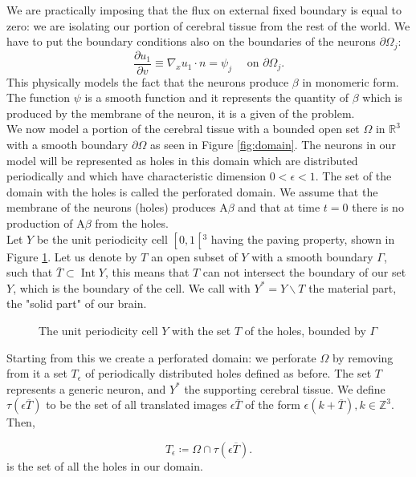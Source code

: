 We are practically imposing that the flux on external fixed boundary is equal to zero: we are isolating our portion of cerebral tissue from the rest of the world.
We have to put the boundary conditions also on the boundaries of the neurons $\partial\Omega_{j}$:
$$ 
\frac{\partial u_{1}}{\partial v} \equiv \nabla_{x} u_1 \cdot n= \psi_{j} \quad \text { on } \partial\Omega_{j}.
$$
This physically models the fact that the neurons produce \(\beta\) in monomeric form. The function $\psi$ is a smooth function and it represents the quantity of \(\beta\) which is produced by the membrane of the neuron, it is a given of the problem.\\
We now model a portion of the cerebral tissue with a bounded open set $\Omega$ in $\mathbb{R}^{3}$ with a smooth boundary $\partial \Omega$ as seen in Figure \ref{fig:domain}. The neurons in our model will be represented as holes in this domain which are distributed periodically and which have characteristic dimension $0<\epsilon<1$. The set of the domain with the holes is called the perforated domain.
We assume that the membrane of the neurons (holes) produces $\mathrm{A} \beta$ and that at time $t=0$ there is no production of  $\mathrm{A} \beta$ from the holes. \\
Let $Y$ be the unit periodicity cell $\left[0,1\left[{ }^{3}\right.\right.$ having the paving property, shown in Figure \ref{fig:unit_cell}. 
Let us denote by $T$ an open subset of $Y$ with a smooth boundary $\Gamma$, such that $\overline{T} \subset \operatorname{Int} Y$, this means that $T$ can not intersect the boundary of our set $Y$, which is the boundary of the cell. We call with $Y^{*}=Y \backslash T$ the material part, the "solid part" of our brain. 
\begin{figure}[H]
    \centering
    \caption{The unit periodicity cell $Y$ with the set $T$ of the holes, bounded by \(\Gamma\)}
    \label{fig:unit_cell}
  \end{figure}

Starting from this we create a perforated domain: we perforate $\Omega$ by removing from it a set $T_{\epsilon}$ of periodically distributed holes defined as before. The set $T$ represents a generic neuron, and $Y^{*}$ the supporting cerebral tissue. We define $\tau(\epsilon \overline{T})$ to be the set of all translated images $\epsilon \overline{T}$ of the form $\epsilon(k+\overline{T}), k \in \mathbb{Z}^{3}$. Then,

\[ T_{\epsilon} \coloneqq \Omega \cap \tau(\epsilon \overline{T}) . \] is the set of all the holes in our domain.


